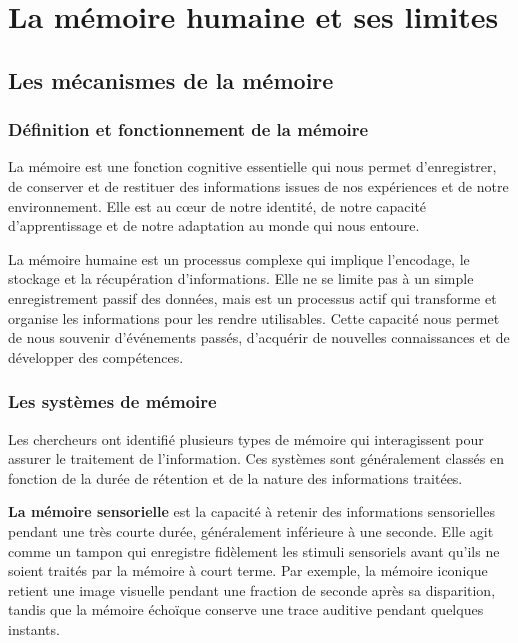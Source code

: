 \documentclass[12pt,a4paper]{report}
\begin{document}
\chapter{La mémoire humaine et ses limites}

\section{Les mécanismes de la mémoire}

\subsection{Définition et fonctionnement de la mémoire}

La mémoire est une fonction cognitive essentielle qui nous permet d'enregistrer, de conserver et de restituer des informations issues de nos expériences et de notre environnement. Elle est au cœur de notre identité, de notre capacité d'apprentissage et de notre adaptation au monde qui nous entoure.

La mémoire humaine est un processus complexe qui implique l'encodage, le stockage et la récupération d'informations. Elle ne se limite pas à un simple enregistrement passif des données, mais est un processus actif qui transforme et organise les informations pour les rendre utilisables. Cette capacité nous permet de nous souvenir d'événements passés, d'acquérir de nouvelles connaissances et de développer des compétences.

\subsection{Les systèmes de mémoire}

Les chercheurs ont identifié plusieurs types de mémoire qui interagissent pour assurer le traitement de l'information. Ces systèmes sont généralement classés en fonction de la durée de rétention et de la nature des informations traitées.

\textbf{La mémoire sensorielle} est la capacité à retenir des informations sensorielles pendant une très courte durée, généralement inférieure à une seconde. Elle agit comme un tampon qui enregistre fidèlement les stimuli sensoriels avant qu'ils ne soient traités par la mémoire à court terme. Par exemple, la mémoire iconique retient une image visuelle pendant une fraction de seconde après sa disparition, tandis que la mémoire échoïque conserve une trace auditive pendant quelques instants.
\end{document}
